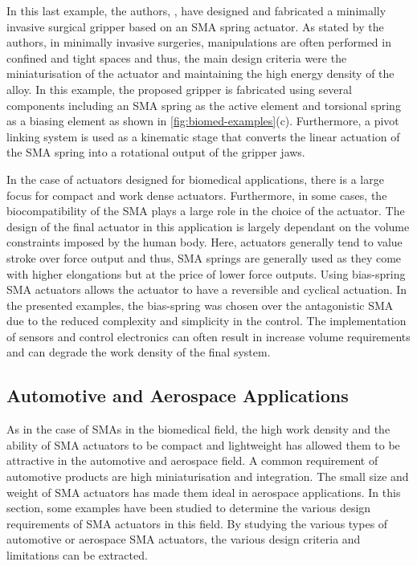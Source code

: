 In this last example, the authors, \cite{roshanDesignFabricationMinimally2018}, have designed and fabricated a minimally invasive surgical gripper based on an SMA spring actuator. As stated by the authors, in minimally invasive surgeries, manipulations are often performed in confined and tight spaces and thus, the main design criteria were the miniaturisation of the actuator and maintaining the high energy density of the alloy. In this example, the proposed gripper is fabricated using several components including an SMA spring as the active element and torsional spring as a biasing element as shown in \cref{fig:biomed-examples}(c). Furthermore, a pivot linking system is used as a kinematic stage that converts the linear actuation of the SMA spring into a rotational output of the gripper jaws.

In the case of actuators designed for biomedical applications, there is a large focus for compact and work dense actuators. Furthermore, in some cases, the biocompatibility of the SMA plays a large role in the choice of the actuator. The design of the final actuator in this application is largely dependant on the volume constraints imposed by the human body. Here, actuators generally tend to value stroke over force output and thus, SMA springs are generally used as they come with higher elongations but at the price of lower force outputs. Using bias-spring SMA actuators allows the actuator to have a reversible and cyclical actuation. In the presented examples, the bias-spring was chosen over the antagonistic SMA due to the reduced complexity and simplicity in the control. The implementation of sensors and control electronics can often result in increase volume requirements and can degrade the work density of the final system.

\subsection{Automotive and Aerospace Applications}
As in the case of SMAs in the biomedical field, the high work density and the ability of SMA actuators to be compact and lightweight has allowed them to be attractive in the automotive and aerospace field. A common requirement of automotive products are high miniaturisation and integration. The small size and weight of SMA actuators has made them ideal in aerospace applications. In this section, some examples have been studied to determine the various design requirements of SMA actuators in this field. By studying the various types of automotive or aerospace SMA actuators, the various design criteria and limitations can be extracted.

